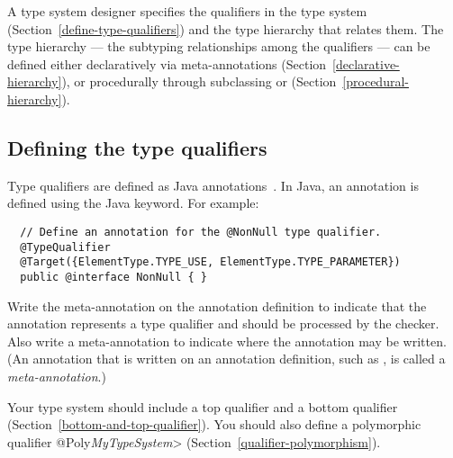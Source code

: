 A type system designer specifies the qualifiers in the type system (Section~\ref{define-type-qualifiers})
and
the type hierarchy that relates them.
The type hierarchy --- the subtyping relationships among the qualifiers ---
can be defined either
declaratively via meta-annotations (Section~\ref{declarative-hierarchy}), or procedurally through
subclassing  or
 (Section~\ref{procedural-hierarchy}).


\subsection{Defining the type qualifiers\label{define-type-qualifiers}}


Type qualifiers are defined as Java annotations~\cite{JSR269}.  In Java, an
annotation is defined using the Java  keyword.
For example:

\begin{Verbatim}
  // Define an annotation for the @NonNull type qualifier.
  @TypeQualifier
  @Target({ElementType.TYPE_USE, ElementType.TYPE_PARAMETER})
  public @interface NonNull { }
\end{Verbatim}

\noindent
Write the  meta-annotation on the annotation definition
to indicate that the annotation represents a type qualifier
and should be processed by the checker.
Also write a 
meta-annotation to indicate where the annotation may be written.
(An annotation that is written on an annotation
definition, such as , is called a \emph{meta-annotation}.)


Your type system should include a top qualifier and a bottom qualifier
(Section~\ref{bottom-and-top-qualifier}).  You should also define a
polymorphic qualifier \<@Poly\emph{MyTypeSystem}>
(Section~\ref{qualifier-polymorphism}).


